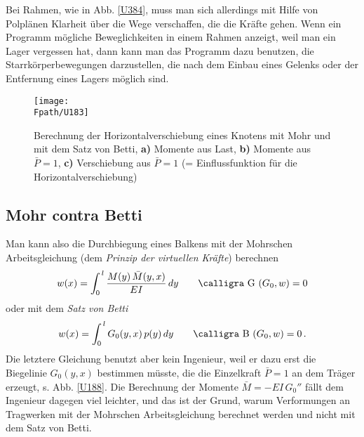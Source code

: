 {{{{Bei Rahmen, wie in Abb. \ref{U384}, muss man sich allerdings mit Hilfe von Polpl\"{a}nen Klarheit \"{u}ber die Wege verschaffen, die die Kr\"{a}fte gehen. Wenn ein Programm m\"{o}gliche Beweglichkeiten in einem Rahmen anzeigt, weil man ein Lager vergessen hat, dann kann man das Programm dazu benutzen, die Starrk\"{o}rperbewegungen darzustellen, die nach dem Einbau eines Gelenks oder der Entfernung eines Lagers m\"{o}glich sind.

\begin{figure}[tbp]
\centering
\if {} \sidecaption \fi
\texttt{[image: \\Fpath/U183]}
\caption{Berechnung der Horizontalverschiebung eines Knotens mit Mohr und mit dem Satz von Betti, \textbf{ a)} Momente aus Last, \textbf{ b)} Momente aus $\bar{P} = 1$, \textbf{ c)} Verschiebung aus $\bar{P} = 1$ (= Einflussfunktion f\"{u}r die Horizontalverschiebung)} \label{U183}
\end{figure}%

{\textcolor{sectionTitleBlue}{\section{Mohr contra Betti}}}
Man kann also die Durchbiegung eines Balkens mit der Mohrschen Arbeitsgleichung (dem {\em Prinzip der virtuellen Kr\"{a}fte\/}) berechnen
\begin{align}\label{Eq132}
w(x) = \int_0^{\,l} \frac{M(y)\,\bar{M}(y,x)}{EI} \,dy \qquad \text{\normalfont\calligra G\,\,}(G_0, w) = 0
\end{align}
oder mit dem {\em Satz von Betti\/}
\begin{align}
w(x) = \int_0^{\,l} G_0(y,x)\,p(y)\,dy \qquad \text{\normalfont\calligra B\,\,}(G_0, w) = 0\,.
\end{align}
Die letztere Gleichung benutzt aber kein Ingenieur, weil er dazu erst die Biegelinie $G_0(y,x) $ bestimmen m\"{u}sste, die die Einzelkraft $\bar{P} = 1 $ an dem Tr\"{a}ger erzeugt, s. Abb. \ref{U188}. Die Berechnung der Momente $\bar{M} = - EI\,G_0'' $ f\"{a}llt dem Ingenieur dagegen viel leichter, und das ist der Grund, warum Verformungen an Tragwerken mit der Mohrschen Arbeitsgleichung berechnet werden und nicht mit dem Satz von Betti.

}}}}
